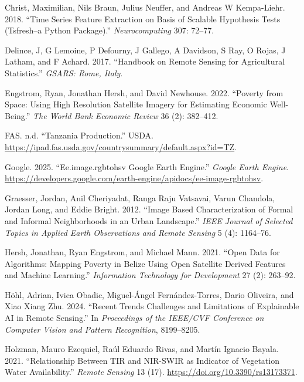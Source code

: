 \documentclass[
  journal,
  twocolumn]{IEEEtran}
\newlength{\cslhangindent}
\newlength{\cslentryspacingunit} %
\newenvironment{CSLReferences}[2] %
 {%
  \setlength{\parindent}{0pt}
  \ifodd #1
  \let\oldpar\par
  \def\par{\hangindent=\cslhangindent\oldpar}
  \fi
  \setlength{\parskip}{#2\cslentryspacingunit}
 }%
 {}
\begin{document}
\begin{CSLReferences}{1}{0}
\leavevmode{}%
Christ, Maximilian, Nils Braun, Julius Neuffer, and Andreas W
Kempa-Liehr. 2018. {``Time Series Feature Extraction on Basis of
Scalable Hypothesis Tests (Tsfresh--a Python Package).''}
\emph{Neurocomputing} 307: 72--77.

\leavevmode{}%
Delince, J, G Lemoine, P Defourny, J Gallego, A Davidson, S Ray, O
Rojas, J Latham, and F Achard. 2017. {``Handbook on Remote Sensing for
Agricultural Statistics.''} \emph{GSARS: Rome, Italy}.

\leavevmode{}%
Engstrom, Ryan, Jonathan Hersh, and David Newhouse. 2022. {``Poverty
from Space: Using High Resolution Satellite Imagery for Estimating
Economic Well-Being.''} \emph{The World Bank Economic Review} 36 (2):
382--412.

\leavevmode{}%
FAS. n.d. {``Tanzania Production.''} USDA.
\url{https://ipad.fas.usda.gov/countrysummary/default.aspx?id=TZ}.

\leavevmode{}%
Google. 2025. {``Ee.image.rgbtohsv Google Earth Engine.''} \emph{Google
Earth Engine}.
\url{https://developers.google.com/earth-engine/apidocs/ee-image-rgbtohsv}.

\leavevmode{}%
Graesser, Jordan, Anil Cheriyadat, Ranga Raju Vatsavai, Varun Chandola,
Jordan Long, and Eddie Bright. 2012. {``Image Based Characterization of
Formal and Informal Neighborhoods in an Urban Landscape.''} \emph{IEEE
Journal of Selected Topics in Applied Earth Observations and Remote
Sensing} 5 (4): 1164--76.

\leavevmode{}%
Hersh, Jonathan, Ryan Engstrom, and Michael Mann. 2021. {``Open Data for
Algorithms: Mapping Poverty in Belize Using Open Satellite Derived
Features and Machine Learning.''} \emph{Information Technology for
Development} 27 (2): 263--92.

\leavevmode{}%
Höhl, Adrian, Ivica Obadic, Miguel-Ángel Fernández-Torres, Dario
Oliveira, and Xiao Xiang Zhu. 2024. {``Recent Trends Challenges and
Limitations of Explainable AI in Remote Sensing.''} In \emph{Proceedings
of the IEEE/CVF Conference on Computer Vision and Pattern Recognition},
8199--8205.

\leavevmode{}%
Holzman, Mauro Ezequiel, Raúl Eduardo Rivas, and Martín Ignacio Bayala.
2021. {``Relationship Between TIR and NIR-SWIR as Indicator of
Vegetation Water Availability.''} \emph{Remote Sensing} 13 (17).
\url{https://doi.org/10.3390/rs13173371}.


\end{CSLReferences}
\end{document}
